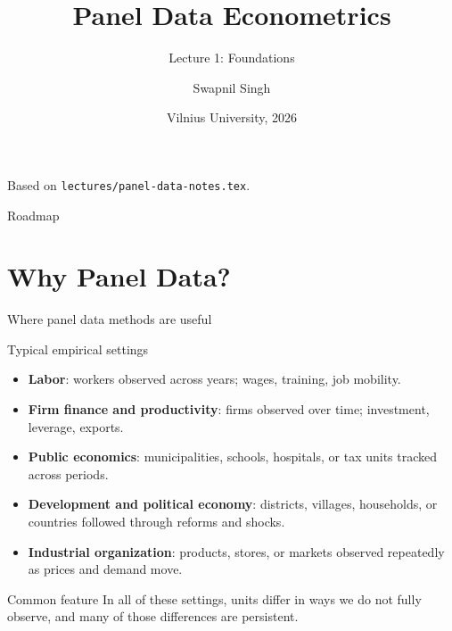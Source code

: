 \documentclass[10pt]{beamer}
\title{Panel Data Econometrics}
\subtitle{Lecture 1: Foundations}
\author{Swapnil Singh}
\institute{Lietuvos Bankas \and Kaunas University of Technology}
\date{Vilnius University, 2026}
\begin{document}
\begin{frame}[plain]
  \titlepage
  \vfill
  {\scriptsize\color{gray} Based on \texttt{lectures/panel-data-notes.tex}.}
\end{frame}

\begin{frame}{Roadmap}
\tableofcontents
\end{frame}

\section{Why Panel Data?}

\begin{frame}{Where panel data methods are useful}
\small
\begin{block}{Typical empirical settings}
\begin{itemize}
  \item \textbf{Labor}: workers observed across years; wages, training, job mobility.
  \item \textbf{Firm finance and productivity}: firms observed over time; investment, leverage, exports.
  \item \textbf{Public economics}: municipalities, schools, hospitals, or tax units tracked across periods.
  \item \textbf{Development and political economy}: districts, villages, households, or countries followed through reforms and shocks.
  \item \textbf{Industrial organization}: products, stores, or markets observed repeatedly as prices and demand move.
\end{itemize}
\end{block}

\pause
\begin{alertblock}{Common feature}
In all of these settings, units differ in ways we do not fully observe, and many of those differences are persistent.
\end{alertblock}
\end{frame}
\end{document}
